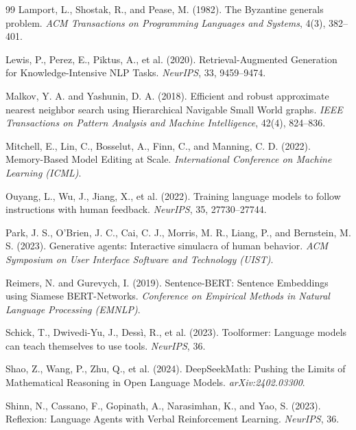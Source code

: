 \documentclass[11pt]{article}
\begin{document}
\begin{thebibliography}{99}
Lamport, L., Shostak, R., and Pease, M. (1982).
\newblock The Byzantine generals problem.
\newblock \emph{ACM Transactions on Programming Languages and Systems}, 4(3), 382--401.

Lewis, P., Perez, E., Piktus, A., et al. (2020).
\newblock Retrieval-Augmented Generation for Knowledge-Intensive NLP Tasks.
\newblock \emph{NeurIPS}, 33, 9459--9474.

Malkov, Y. A. and Yashunin, D. A. (2018).
\newblock Efficient and robust approximate nearest neighbor search using
  Hierarchical Navigable Small World graphs.
\newblock \emph{IEEE Transactions on Pattern Analysis and Machine Intelligence},
  42(4), 824--836.

Mitchell, E., Lin, C., Bosselut, A., Finn, C., and Manning, C. D. (2022).
\newblock Memory-Based Model Editing at Scale.
\newblock \emph{International Conference on Machine Learning (ICML)}.

Ouyang, L., Wu, J., Jiang, X., et al. (2022).
\newblock Training language models to follow instructions with human feedback.
\newblock \emph{NeurIPS}, 35, 27730--27744.

Park, J. S., O'Brien, J. C., Cai, C. J., Morris, M. R., Liang, P., and Bernstein, M. S. (2023).
\newblock Generative agents: Interactive simulacra of human behavior.
\newblock \emph{ACM Symposium on User Interface Software and Technology (UIST)}.

Reimers, N. and Gurevych, I. (2019).
\newblock Sentence-BERT: Sentence Embeddings using Siamese BERT-Networks.
\newblock \emph{Conference on Empirical Methods in Natural Language Processing (EMNLP)}.

Schick, T., Dwivedi-Yu, J., Dess{\`{i}}, R., et al. (2023).
\newblock Toolformer: Language models can teach themselves to use tools.
\newblock \emph{NeurIPS}, 36.

Shao, Z., Wang, P., Zhu, Q., et al. (2024).
\newblock DeepSeekMath: Pushing the Limits of Mathematical Reasoning in Open
  Language Models.
\newblock \emph{arXiv:2402.03300}.

Shinn, N., Cassano, F., Gopinath, A., Narasimhan, K., and Yao, S. (2023).
\newblock Reflexion: Language Agents with Verbal Reinforcement Learning.
\newblock \emph{NeurIPS}, 36.


\end{thebibliography}
\end{document}
